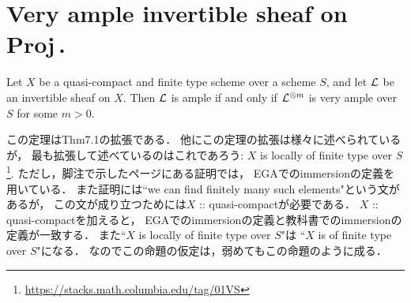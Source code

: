 \documentclass[a4paper]{jsarticle}
\newcommand{\gProj}{\mathbf{Proj}\,}
\begin{document}
\section{Very ample invertible sheaf on $\gProj$.} %
    \begin{Thm}
        Let $X$ be a quasi-compact and finite type scheme over a scheme $S$,
        and let $\mathcal{L}$ be an invertible sheaf on $X$.
        Then $\mathcal{L}$ is ample if and only if 
        $\mathcal{L}^{\otimes m}$ is very ample over $S$ for some $m>0$.
    \end{Thm}
    \begin{Remark}
        この定理はThm7.1の拡張である．
        他にこの定理の拡張は様々に述べられているが，
        最も拡張して述べているのはこれであろう:
        $X$ is locally of finite type over $S$
        \footnote{ \url{https://stacks.math.columbia.edu/tag/01VS} }.
        ただし，脚注で示したページにある証明では，
        EGAでのimmersionの定義を用いている．
        また証明には``we can find finitely many such elements"という文があるが，
        この文が成り立つためには$X$ :: quasi-compactが必要である．
        $X$ :: quasi-compactを加えると，
        EGAでのimmersionの定義と教科書でのimmersionの定義が一致する．
        また``$X$ is locally of finite type over $S$"は
        ``$X$ is of finite type over $S$"になる．
        なのでこの命題の仮定は，弱めてもこの命題のように成る．
    \end{Remark}
\end{document}
